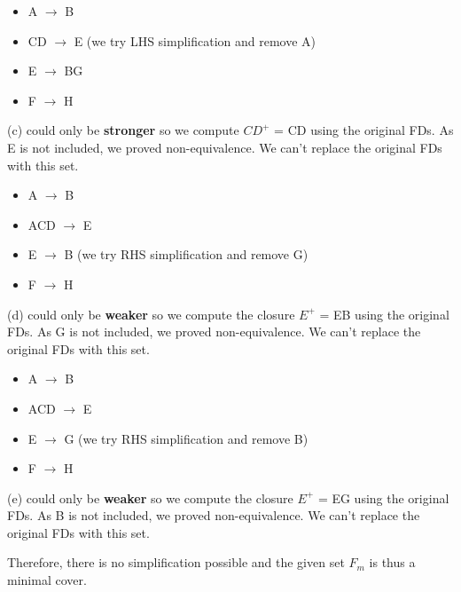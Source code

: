 \documentclass[9pt]{article}
\begin{document}
\begin{enumerate}
\begin{enumerate}
        \begin{itemize}
          \item A $\rightarrow$ B
          \item CD $\rightarrow$ E (we try LHS simplification and remove A)
          \item E $\rightarrow$ BG
          \item F $\rightarrow$ H
        \end{itemize}
        (c) could only be \textbf{stronger} so we compute $CD^+$ = CD using the original FDs. As E is not included, we proved non-equivalence. We can't replace the original FDs with this set.
        \begin{itemize}
          \item A $\rightarrow$ B
          \item ACD $\rightarrow$ E
          \item E $\rightarrow$ B (we try RHS simplification and remove G)
          \item F $\rightarrow$ H
        \end{itemize}
        (d) could only be \textbf{weaker} so we compute the closure $E^+$ = EB using the original FDs. As G is not included, we proved non-equivalence. We can't replace the original FDs with this set.
        \begin{itemize}
          \item A $\rightarrow$ B
          \item ACD $\rightarrow$ E
          \item E $\rightarrow$ G (we try RHS simplification and remove B)
          \item F $\rightarrow$ H
        \end{itemize}
        (e) could only be \textbf{weaker} so we compute the closure $E^+$ = EG using the original FDs. As B is not included, we proved non-equivalence. We can't replace the original FDs with this set.    
    \end{enumerate}
    Therefore, there is no simplification possible and the given set $F_m$ is thus a minimal cover.
    

\end{enumerate}
\end{document}
